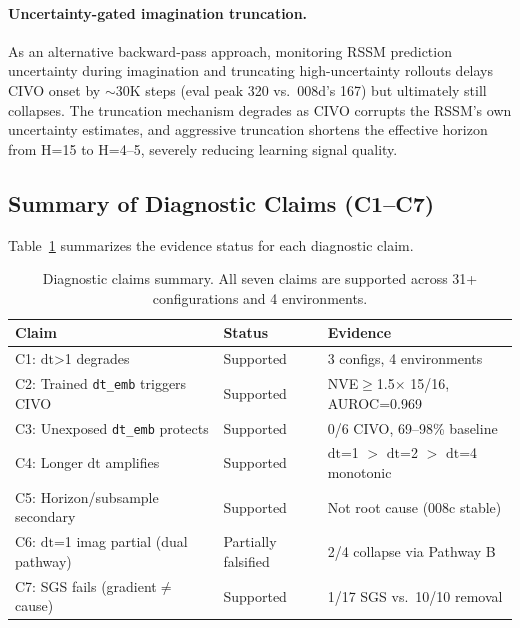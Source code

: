 \documentclass{article}
\newcommand{\dt}{\mathrm{dt}}
\begin{document}
\paragraph{Uncertainty-gated imagination truncation.}
As an alternative backward-pass approach, monitoring RSSM prediction uncertainty during imagination and truncating high-uncertainty rollouts delays CIVO onset by $\sim$30K steps (eval peak 320 vs.\ 008d's 167) but ultimately still collapses.
The truncation mechanism degrades as CIVO corrupts the RSSM's own uncertainty estimates, and aggressive truncation shortens the effective horizon from H=15 to H=4--5, severely reducing learning signal quality.

\subsection{Summary of Diagnostic Claims (C1--C7)}

Table~\ref{tab:claims-summary} summarizes the evidence status for each diagnostic claim.

\begin{table}[h]
\centering
\caption{Diagnostic claims summary. All seven claims are supported across 31+ configurations and 4 environments.}
\label{tab:claims-summary}
\begin{tabular}{lll}
\toprule
\textbf{Claim} & \textbf{Status} & \textbf{Evidence} \\
\midrule
C1: $\dt$>1 degrades & Supported & 3 configs, 4 environments \\
C2: Trained \texttt{dt\_emb} triggers CIVO & Supported & NVE$\geq$1.5$\times$ 15/16, AUROC=0.969 \\
C3: Unexposed \texttt{dt\_emb} protects & Supported & 0/6 CIVO, 69--98\% baseline \\
C4: Longer $\dt$ amplifies & Supported & $\dt$=1 $>$ $\dt$=2 $>$ $\dt$=4 monotonic \\
C5: Horizon/subsample secondary & Supported & Not root cause (008c stable) \\
C6: $\dt$=1 imag partial (dual pathway) & Partially falsified & 2/4 collapse via Pathway B \\
C7: SGS fails (gradient$\neq$cause) & Supported & 1/17 SGS vs.\ 10/10 removal \\
\bottomrule
\end{tabular}
\end{table}


\end{document}
